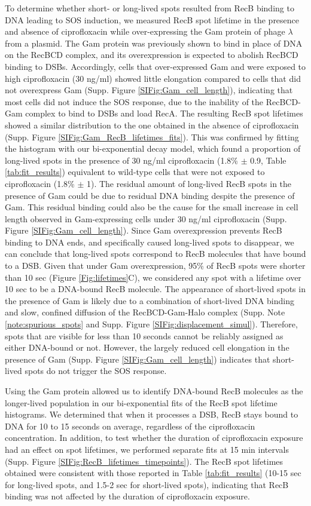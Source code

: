To determine whether short- or long-lived spots resulted from RecB binding to DNA leading to SOS induction, we measured RecB spot lifetime in the presence and absence of ciprofloxacin while over-expressing the Gam protein of phage $\lambda$ from a plasmid. The Gam protein was previously shown to bind in place of DNA on the RecBCD complex\cite{Wilkinson2016}, and its overexpression is expected to abolish RecBCD binding to DSBs. Accordingly, cells that over-expressed Gam and were exposed to high ciprofloxacin (30 ng/ml) showed little elongation compared to cells that did not overexpress Gam (Supp. Figure \ref{SIFig:Gam_cell_length}), indicating that most cells did not induce the SOS response, due to the inability of the RecBCD-Gam complex to bind to DSBs and load RecA. The resulting RecB spot lifetimes showed a similar distribution to the one obtained in the absence of ciprofloxacin (Supp. Figure \ref{SIFig:Gam_RecB_lifetimes_fits}). This was confirmed by fitting the histogram with our bi-exponential decay model, which found a proportion of long-lived spots in the presence of 30 ng/ml ciprofloxacin (1.8\% $\pm$ 0.9, Table \ref{tab:fit_results}) equivalent to wild-type cells that were not exposed to ciprofloxacin (1.8\% $\pm$ 1). The residual amount of long-lived RecB spots in the presence of Gam could be due to residual DNA binding despite the presence of Gam. This residual binding could also be the cause for the small increase in cell length observed in Gam-expressing cells under 30 ng/ml ciprofloxacin (Supp. Figure \ref{SIFig:Gam_cell_length}). Since Gam overexpression prevents RecB binding to DNA ends, and specifically caused long-lived spots to disappear, we can conclude that long-lived spots correspond to RecB molecules that have bound to a DSB. Given that under Gam overexpression, 95\% of RecB spots were shorter than 10 sec (Figure \ref{Fig:lifetimes}C), we considered any spot with a lifetime over 10 sec to be a DNA-bound RecB molecule. The appearance of short-lived spots in the presence of Gam is likely due to a combination of short-lived DNA binding and slow, confined diffusion of the RecBCD-Gam-Halo complex (Supp. Note \ref{note:spurious_spots} and Supp. Figure \ref{SIFig:displacement_simul}). Therefore, spots that are visible for less than 10 seconds cannot be reliably assigned as either DNA-bound or not. However, the largely reduced cell elongation in the presence of Gam (Supp. Figure \ref{SIFig:Gam_cell_length}) indicates that short-lived spots do not trigger the SOS response.

Using the Gam protein allowed us to identify DNA-bound RecB molecules as the longer-lived population in our bi-exponential fits of the RecB spot lifetime histograms. We determined that when it processes a DSB, RecB stays bound to DNA for 10 to 15 seconds on average, regardless of the ciprofloxacin concentration. In addition, to test whether the duration of ciprofloxacin exposure had an effect on spot lifetimes, we performed separate fits at 15 min intervals (Supp. Figure \ref{SIFig:RecB_lifetimes_timepoints}). The RecB spot lifetimes obtained were consistent with those reported in Table \ref{tab:fit_results} (10-15 sec for long-lived spots, and 1.5-2 sec for short-lived spots), indicating that RecB binding was not affected by the duration of ciprofloxacin exposure.

